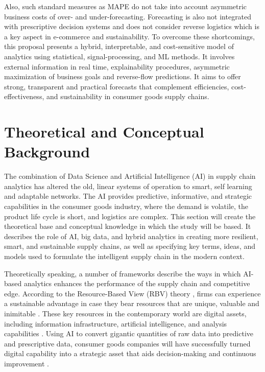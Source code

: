 Also, such standard measures as MAPE do not take into account asymmetric business costs of over- and under-forecasting. Forecasting is also not integrated with prescriptive decision systems and does not consider reverse logistics which is a key aspect in e-commerce and sustainability. To overcome these shortcomings, this proposal presents a hybrid, interpretable, and cost-sensitive model of analytics using statistical, signal-processing, and ML methods. It involves external information in real time, explainability procedures, asymmetric maximization of business goals and reverse-flow predictions. It aims to offer strong, transparent and practical forecasts that complement efficiencies, cost-effectiveness, and sustainability in consumer goods supply chains.


\section{Theoretical and Conceptual Background}

The combination of Data Science and Artificial Intelligence (AI) in supply chain analytics has altered the old, linear systems of operation to smart, self learning and adaptable networks. The AI provides predictive, informative, and strategic capabilities in the consumer goods industry, where the demand is volatile, the product life cycle is short, and logistics are complex. This section will create the theoretical base and conceptual knowledge in which the study will be based. It describes the role of AI, big data, and hybrid analytics in creating more resilient, smart, and sustainable supply chains, as well as specifying key terms, ideas, and models used to formulate the intelligent supply chain in the modern context.

Theoretically speaking, a number of frameworks describe the ways in which AI-based analytics enhances the performance of the supply chain and competitive edge. According to the Resource-Based View (RBV) theory \autocite{barney1991}, firms can experience a sustainable advantage in case they bear resources that are unique, valuable and inimitable \autocite{Jackson01092024}. These key resources in the contemporary world are digital assets, including information infrastructure, artificial intelligence, and analysis capabilities \autocite{mailani2024}. Using AI to convert gigantic quantities of raw data into predictive and prescriptive data, consumer goods companies will have successfully turned digital capability into a strategic asset that aids decision-making and continuous improvement \autocite{groenewald2024, jauhar_explainable_2024, aghaei2025potentiallargelanguagemodels}.

